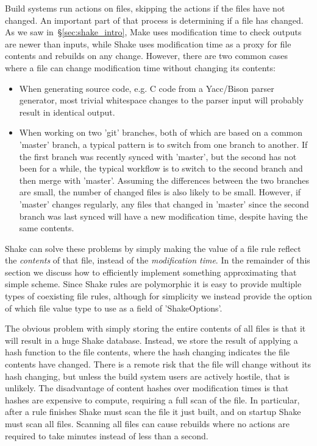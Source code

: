 Build systems run actions on files, skipping the actions if the files have not
changed. An important part of that process is determining if a file has
changed. As we saw in~\S\ref{sec:shake_intro}, Make uses modification time to
check outputs are newer than inputs, while Shake uses modification time as a
proxy for file contents and rebuilds on any change. However, there are two
common cases where a file can change modification time without changing its
contents:

\begin{itemize}
\item When generating source code, e.g. C code from a Yacc/Bison parser generator,
most trivial whitespace changes to the parser input will probably result in
identical output.
\item When working on two \lst'git' branches, both of which are based on a
common \lst'master' branch, a typical pattern is to switch from one branch to
another. If the first branch was recently synced with \lst'master', but the
second has not been for a while, the typical workflow is to switch to the second
branch and then merge with \lst'master'. Assuming the differences between the
two branches are small, the number of changed files is also likely to be small.
However, if \lst'master' changes regularly, any files that changed in
\lst'master' since the second branch was last synced will have a new
modification time, despite having the same contents.
\end{itemize}
\noindent
Shake can solve these problems by simply making the value of a file rule reflect the
\emph{contents} of that file, instead of the \emph{modification time}. In the remainder of
this section we discuss how to efficiently implement something approximating
that simple scheme. Since Shake rules are polymorphic it is easy to provide
multiple types of coexisting file rules, although for simplicity we instead
provide the option of which file value type to use as a field of
\lst'ShakeOptions'.

The obvious problem with simply storing the entire contents of all files is that
it will result in a huge Shake database. Instead, we store the result of
applying a hash function to the file contents, where the hash changing indicates
the file contents have changed. There is a remote risk that the file will
change without its hash changing, but unless the build system users are actively
hostile, that is unlikely. The disadvantage of content hashes over modification
times is that hashes are expensive to compute, requiring a full scan of the
file. In particular, after a rule finishes Shake must scan the file it just
built, and on startup Shake must scan all files. Scanning all files can cause
rebuilds where no actions are required to take minutes instead of less than a
second.

